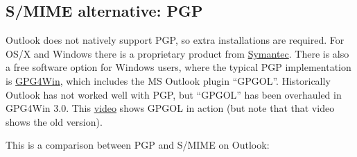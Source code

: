 \documentclass[pdftex,12pt,titlepage=false]{scrartcl}
\begin{document}
\begin{appendices}%
  \begin{minipage}{\textwidth}%
    \section{S/MIME alternative: PGP}
    Outlook does not natively support PGP, so extra installations are
    required.  For OS/X and Windows there is a proprietary product from
    \href{https://www.symantec.com/products/desktop-email-encryption}{Symantec}.
    There is also a free software option for Windows users, where the
    typical PGP implementation is
    \href{https://www.gpg4win.org/version3.html}{GPG4Win}, which includes
    the MS Outlook plugin ``GPGOL''.  Historically Outlook has not worked
    well with PGP, but ``GPGOL'' has been overhauled in GPG4Win 3.0.  This
    \href{https://www.youtube.com/watch?v=-TOUeTFUfgQ}{video} shows GPGOL
    in action (but note that that video shows the old version).

    This is a comparison between PGP and S/MIME on Outlook:\\[1em]



\end{minipage}
\end{appendices}
\end{document}
